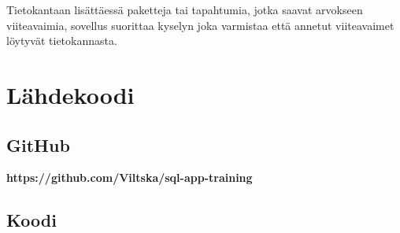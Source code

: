 \documentclass[12pt,a4paper]{article}
\begin{document}
Tietokantaan lisättäessä paketteja tai tapahtumia, jotka saavat arvokseen viiteavaimia, sovellus suorittaa kyselyn joka varmistaa että annetut viiteavaimet löytyvät tietokannasta.





\newpage
\section{Lähdekoodi}
\subsection*{GitHub}
\textbf{https://github.com/Viltska/sql-app-training}
\subsection*{Koodi}


\newpage
\end{document}
